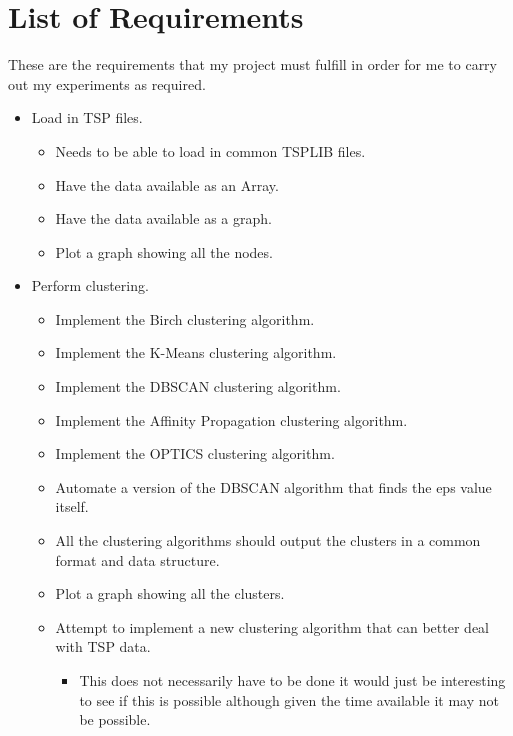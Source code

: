 \chapter{List of Requirements}\label{appendix_requirements}

These are the requirements that my project must fulfill in order for me to carry out my experiments as required.

\begin{itemize}
    \item Load in TSP files.
        \begin{itemize}
            \item Needs to be able to load in common TSPLIB files.
            \item Have the data available as an Array.
            \item Have the data available as a graph.
            \item Plot a graph showing all the nodes.
        \end{itemize}
    \item Perform clustering.
        \begin{itemize}
            \item Implement the Birch clustering algorithm.
            \item Implement the K-Means clustering algorithm.
            \item Implement the DBSCAN clustering algorithm.
            \item Implement the Affinity Propagation clustering algorithm.
            \item Implement the OPTICS clustering algorithm.
            \item Automate a version of the DBSCAN algorithm that finds the eps value itself.
            \item All the clustering algorithms should output the clusters in a common format and data structure.
            \item Plot a graph showing all the clusters.
            \item Attempt to implement a new clustering algorithm that can better deal with TSP data.
            \begin{itemize}
                \item This does not necessarily have to be done it would just be interesting to see if this is possible although given the time available it may not be possible.
            \end{itemize}
        \end{itemize}

\end{itemize}
